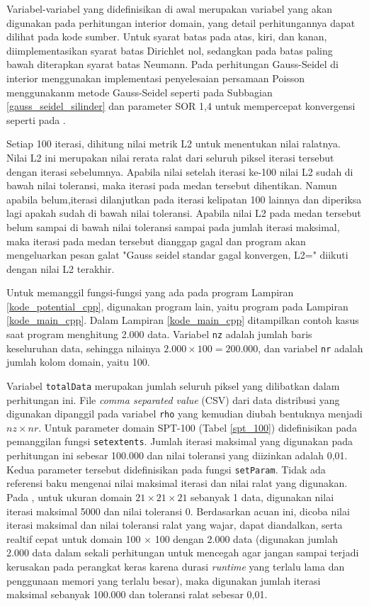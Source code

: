 Variabel-variabel yang didefinisikan di awal merupakan variabel yang akan digunakan pada perhitungan interior domain, yang detail perhitungannya dapat dilihat pada kode sumber. Untuk syarat batas pada atas, kiri, dan kanan, diimplementasikan syarat batas Dirichlet nol, sedangkan pada batas paling bawah diterapkan syarat batas Neumann. Pada perhitungan Gauss-Seidel di interior menggunakan implementasi penyelesaian persamaan Poisson menggunakanm metode Gauss-Seidel seperti pada Subbagian \ref{gauss_seidel_silinder} dan parameter SOR 1,4 untuk mempercepat konvergensi seperti pada \cite{lubos_brieda_2019}.

Setiap 100 iterasi, dihitung nilai metrik L2 untuk menentukan nilai ralatnya. Nilai L2 ini merupakan nilai rerata ralat dari seluruh piksel iterasi tersebut dengan iterasi sebelumnya. Apabila nilai setelah iterasi ke-100 nilai L2 sudah di bawah nilai toleransi, maka iterasi pada medan tersebut dihentikan. Namun apabila belum,iterasi dilanjutkan pada iterasi kelipatan 100 lainnya dan diperiksa lagi apakah sudah di bawah nilai toleransi. Apabila nilai L2 pada medan tersebut belum sampai di bawah nilai toleransi sampai pada jumlah iterasi maksimal, maka iterasi pada medan tersebut dianggap gagal dan program akan mengeluarkan pesan galat "Gauss seidel standar gagal konvergen, L2=" diikuti dengan nilai L2 terakhir. 

Untuk memanggil fungsi-fungsi yang ada pada program Lampiran \ref{kode_potential_cpp}, digunakan program lain, yaitu program pada Lampiran \ref{kode_main_cpp}. Dalam Lampiran \ref{kode_main_cpp} ditampilkan contoh kasus saat program menghitung 2.000 data. Variabel \texttt{nz} adalah jumlah baris keseluruhan data, sehingga nilainya $2.000 \times 100 = 200.000$, dan variabel \texttt{nr} adalah jumlah kolom domain, yaitu 100.

Variabel \texttt{totalData} merupakan jumlah seluruh piksel yang dilibatkan dalam perhitungan ini. File \textit{comma separated value} (CSV) dari data distribusi yang digunakan dipanggil pada variabel \texttt{rho} yang kemudian diubah bentuknya menjadi $nz \times nr$. Untuk parameter domain SPT-100 (Tabel \ref{spt_100}) didefinisikan pada pemanggilan fungsi \texttt{setextents}. Jumlah iterasi maksimal yang digunakan pada perhitungan ini sebesar 100.000 dan nilai toleransi yang diizinkan adalah 0,01. Kedua parameter tersebut didefinisikan pada fungsi \texttt{setParam}. Tidak ada referensi baku mengenai nilai maksimal iterasi dan nilai ralat yang digunakan. Pada \cite{lubos_brieda_2019}, untuk ukuran domain $21 \times 21 \times 21$ sebanyak 1 data, digunakan nilai iterasi maksimal 5000 dan nilai toleransi 0. Berdasarkan acuan ini, dicoba nilai iterasi maksimal dan nilai toleransi ralat yang wajar, dapat diandalkan, serta realtif cepat untuk domain 100 $\times$ 100 dengan 2.000 data (digunakan jumlah 2.000 data dalam sekali perhitungan untuk mencegah agar jangan sampai terjadi kerusakan pada perangkat keras karena durasi \textit{runtime} yang terlalu lama dan penggunaan memori yang terlalu besar), maka digunakan jumlah iterasi maksimal sebanyak 100.000 dan toleransi ralat sebesar 0,01.

